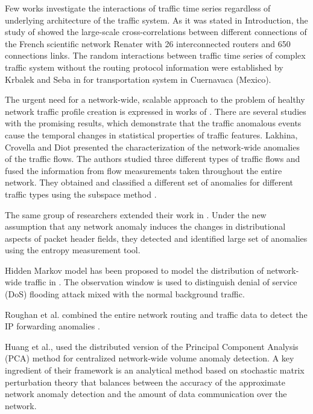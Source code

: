 \documentclass{IEEEtran}
\begin{document}
Few works investigate the interactions of traffic time series regardless
of underlying architecture of the traffic system. As it was stated
in Introduction, the study of \cite{Barthelemy} showed the large-scale
cross-correlations between different connections of the French scientific
network Renater with 26 interconnected routers and 650 connections
links. The random interactions between traffic time series of complex
traffic system without the routing protocol information were established
by Krbalek and Seba in \cite{Seba} for transportation system in Cuernavaca
(Mexico). 

The urgent need for a network-wide, scalable approach to the problem
of healthy network traffic profile creation is expressed in works
of \cite{Crovella,Crovella2,Min,McNutt,Roughan,Huang}. There are
several studies with the promising results, which demonstrate that
the traffic anomalous events cause the temporal changes in statistical
properties of traffic features. Lakhina, Crovella and Diot presented
the characterization of the network-wide anomalies of the traffic
flows. The authors studied three different types of traffic flows
and fused the information from flow measurements taken throughout
the entire network. They obtained and classified a different set of
anomalies for different traffic types using the subspace method \cite{Crovella2}.

The same group of researchers extended their work in \cite{Crovella}.
Under the new assumption that any network anomaly induces the changes
in distributional aspects of packet header fields, they detected and
identified large set of anomalies using the entropy measurement tool.

Hidden Markov model has been proposed to model the distribution of
network-wide traffic in \cite{Min}. The observation window is used
to distinguish denial of service (DoS) flooding attack mixed with
the normal background traffic. 

Roughan et al. combined the entire network routing and traffic data
to detect the IP forwarding anomalies \cite{Roughan}.

Huang et al., \cite{Huang} used the distributed version of the Principal
Component Analysis (PCA) method for centralized network-wide volume
anomaly detection. A key ingredient of their framework is an analytical
method based on stochastic matrix perturbation theory that balances
between the accuracy of the approximate network anomaly detection
and the amount of data communication over the network. 
\end{document}
